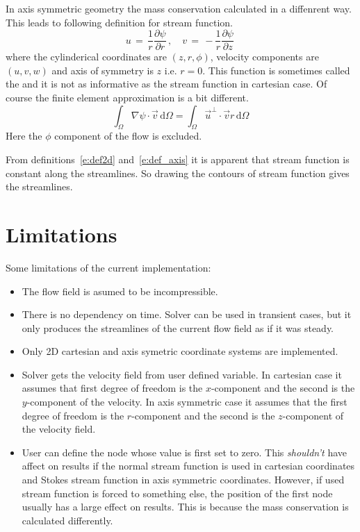 In axis symmetric geometry the mass conservation calculated in a diffenrent way.
This leads to following definition for stream function. 
\begin{equation}\label{e:def_axis}
u \, = \, \frac{1}{r}\frac{\partial \psi}{\partial r} \, , \quad
v \, = \, - \frac{1}{r}\frac{\partial \psi}{\partial z} \,
\end{equation}
where the cylinderical coordinates are $(z,r,\phi)$, velocity components
are $(u,v,w)$ and axis of symmetry is $z$ i.e. $r=0$.
This function is sometimes called the \emph{} 
and it is not as informative as the stream function in cartesian case.
Of course the finite element approximation is a bit different.
\begin{equation}
\int_\Omega \nabla \psi \cdot \vec v \, \text{d}\Omega
=
\int_\Omega \vec u^\perp \cdot \vec v r \, \text{d}\Omega
\end{equation}
Here the $\phi$ component of the flow is excluded.

From definitions~\eqref{e:def2d} and~\eqref{e:def_axis} it is apparent that 
stream function is constant along the streamlines. So drawing the contours 
of stream function gives the streamlines.

\section{Limitations}

Some limitations of the current implementation:
\begin{itemize}

\item The flow field is asumed to be incompressible.

\item There is no dependency on time. Solver can be used in transient cases, but
it only produces the streamlines of the current flow field as if it was steady. 

\item Only 2D cartesian and axis symetric coordinate systems are implemented.

\item Solver gets the velocity field from user defined variable. In cartesian case
it assumes that first degree of freedom is the $x$-component and the second is the
$y$-component of the velocity. In axis symmetric case it assumes that the first
degree of freedom is the $r$-component and the second is the $z$-component of
the velocity field.

\item User can define the node whose value is first set to zero. This \emph{shouldn't}
have affect on results if the normal stream function is used in cartesian coordinates
and Stokes stream function in axis symmetric coordinates. However, if used stream function
is forced to something else, the position of the first node usually has a large
effect on results. 
This is because the mass conservation is calculated differently.

\end{itemize}

